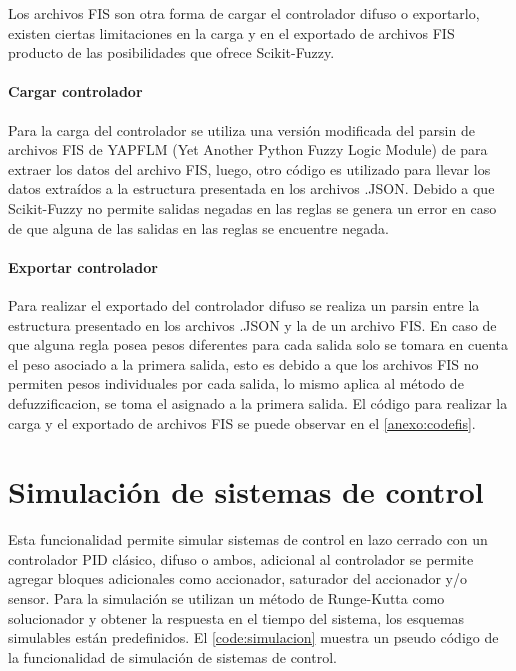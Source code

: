             Los archivos FIS son otra forma de cargar el controlador difuso o exportarlo, existen ciertas limitaciones en la carga y en el exportado de archivos FIS producto de las posibilidades que ofrece Scikit-Fuzzy.

            \paragraph{Cargar controlador}
            
                 Para la carga del controlador se utiliza una versión modificada del parsin de archivos FIS de YAPFLM (Yet Another Python Fuzzy Logic Module) de \textcite{sputnick1124} para extraer los datos del archivo FIS, luego, otro código es utilizado para llevar los datos extraídos a la estructura presentada en los archivos .JSON. Debido a que Scikit-Fuzzy no permite salidas negadas en las reglas se genera un error en caso de que alguna de las salidas en las reglas se encuentre negada.
            
            \paragraph{Exportar controlador}

                Para realizar el exportado del controlador difuso se realiza un parsin entre la estructura presentado en los archivos .JSON y la de un archivo FIS. En caso de que alguna regla posea pesos diferentes para cada salida solo se tomara en cuenta el peso asociado a la primera salida, esto es debido a que los archivos FIS no permiten pesos individuales por cada salida, lo mismo aplica al método de defuzzificacion, se toma el asignado a la primera salida. El código para realizar la carga y el exportado de archivos FIS se puede observar en el \ref{anexo:codefis}.

\section{Simulación de sistemas de control}

    Esta funcionalidad permite simular sistemas de control en lazo cerrado con un controlador PID clásico, difuso o ambos, adicional al controlador se permite agregar bloques adicionales como accionador, saturador del accionador y/o sensor. Para la simulación se utilizan un método de Runge-Kutta como solucionador y obtener la respuesta en el tiempo del sistema, los esquemas simulables están predefinidos. El \cref{code:simulacion} muestra un pseudo código de la funcionalidad de simulación de sistemas de control.

